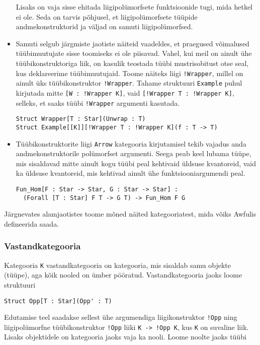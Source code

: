 \documentclass[12pt]{article}
\begin{document}
\begin{itemize}
            Lisaks on vaja sisse ehitada liigipolümorfsete funktsioonide tugi, mida hetkel ei ole. Seda on tarvis põhjusel, et liigipolümorfsete tüüpide andmekonstruktorid ja väljad on samuti liigipolümorfsed.
          \item
            Samuti selgub järgmiste jaotiste näiteid vaadeldes, et praegused võimalused tüübimuutujate sisse toomiseks ei ole piisavad. Vahel, kui meil on ainult ühe tüübikonstruktoriga liik, on kasulik teostada tüübi mustrisobitust otse seal, kus deklareerime tüübimuutujaid. Toome näiteks liigi \verb"!Wrapper", millel on ainult üks tüübikonstruktor \verb"!Wrapper". Tahame struktuuri \verb!Example! puhul kirjutada mitte \verb"[W : !Wrapper K]", vaid \verb"[!Wrapper T : !Wrapper K]", selleks, et saaks tüübi \verb"!Wrapper" argumenti kasutada.

            \begin{verbatim}Struct Wrapper[T : Star](Unwrap : T)
Struct Example[[K]][!Wrapper T : !Wrapper K](f : T -> T)\end{verbatim}
          \item
            Tüübikonstruktorite liigi \verb!Arrow! kategooria kirjutamisel tekib vajadus anda andmekonstruktorile polümorfset argumenti. Seega peab keel lubama tüüpe, mis sisaldavad mitte ainult kogu tüübi peal kehtivaid üldsuse kvantoreid, vaid ka üldsuse kvantoreid, mis kehtivad ainult ühe funktsiooniargumendi peal.

            \begin{verbatim}Fun_Hom[F : Star -> Star, G : Star -> Star] :
  (Forall [T : Star] F T -> G T) -> Fun_Hom F G\end{verbatim}
        \end{itemize}

        Järgnevates alamjaotistes toome mõned näited kategooriatest, mida võiks Awfulis defineerida saada.
      \subsubsection{Vastandkategooria}
        Kategooria \verb!K! vastandkategooria on kategooria, mis sisaldab samu objekte (tüüpe), aga kõik nooled on ümber pööratud. Vastandkategooria jaoks loome struktuuri

        \begin{verbatim}Struct Opp[T : Star](Opp' : T)\end{verbatim}

        Edutamise teel saadakse sellest ühe argumendiga liigikonstruktor \verb"!Opp" ning liigipolümorfne tüübikonstruktor \verb"!Opp" liiki \verb"K -> !Opp K", kus \verb!K! on suvaline liik. Lisaks objektidele on kategooria jaoks vaja ka nooli. Loome noolte jaoks tüübi
\end{document}
